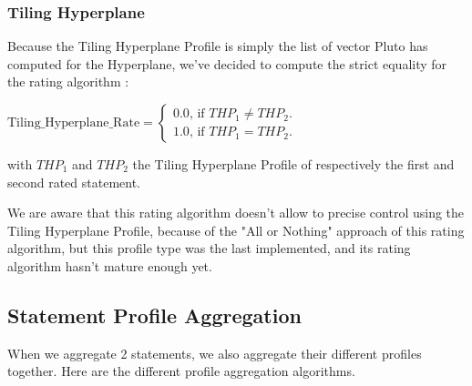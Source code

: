 \documentclass[paper=a4, fontsize=11.5pt]{scrartcl}
\numberwithin{equation}{section}        %
\numberwithin{figure}{section}          %
\numberwithin{table}{section}               %
\begin{document}
        \subsubsection{Tiling Hyperplane}
            Because the Tiling Hyperplane Profile is simply the list of vector
            Pluto has computed for the Hyperplane, we've decided to compute the strict
            equality for the rating algorithm : 
            \begin{center}
                $ \mathrm{Tiling\_Hyperplane\_Rate} =  \left \{
                    \begin{array}{c}
                        0.0\text{, if } \mathit{THP}_1 \neq \mathit{THP}_2. \\
                        1.0\text{, if } \mathit{THP}_1 = \mathit{THP}_2.
                    \end{array} \right.$
            \end{center}
            with $\mathit{THP}_1$ and $\mathit{THP}_2$ the Tiling Hyperplane Profile of 
            respectively the first and second rated statement.

            We are aware that this rating algorithm doesn't allow to precise control using the
            Tiling Hyperplane Profile, because of the "All or Nothing" approach of this
            rating algorithm, but this profile type was the last implemented, and its rating
            algorithm hasn't mature enough yet.

    \subsection{Statement Profile Aggregation}
        When we aggregate 2 statements, we also aggregate their different profiles together.
        Here are the different profile aggregation algorithms.
\end{document}
